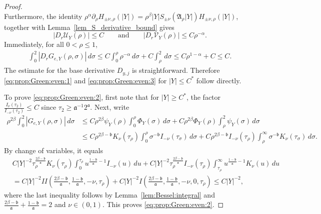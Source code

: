 \documentclass[12pt]{amsart}
\begin{document}
\begin{proof}
\begin{equation*}
\end{equation*}
Furthermore, the identity $\rho^{\alpha} \partial_\rho H_{\pm \nu, \rho}(|Y|) = \rho^{\beta} |Y| S_{\pm \nu}(\mathfrak A_\rho |Y|) H_{\pm \nu, \rho}(|Y|)$, together with
Lemma~\ref{lem_S_derivative_bound} gives
\begin{equation*}
    |D_r \mathcal{U}_Y(\rho)|\le C
    \qquad\text{and}\qquad
    |D_r \mathcal{V}_Y(\rho)|\le C \rho^{-\alpha}.
\end{equation*}
Immediately, for all $0<\rho\le 1$,
\begin{align*}
    \int_0^2 |D_r G_{e,Y}(\rho,\sigma)| \, d\sigma \le C \int_0^\rho \rho^{-\alpha}\, d\sigma + C\int_\rho^2 \, d\sigma \le C \rho^{1-\alpha} + C\le C.
\end{align*}
The estimate for the base derivative $D_{y,j}$ is straightforward. Therefore \eqref{eq:prop:Green:even:1} and \eqref{eq:prop:Green:even:3} for $|Y|\le C^*$ follow directly.

To prove \eqref{eq:prop:Green:even:2}, first note that for $|Y|\ge C^*$, the factor $\frac{I_\nu(\tau_2)}{I_{-\nu}(\tau_2)}\le C$ since $\tau_2 \ge \mathfrak a^{-1} 2^{\mathfrak a}$. Next, write
\begin{align*}
    \rho^{2\beta}\int_0^2 |G_{e,Y}(\rho,\sigma)| \, d\sigma &\le C \rho^{2\beta} \psi_Y(\rho) \int_0^\rho \Phi_Y(\sigma) \,d\sigma + C \rho^{2\beta} \Phi_Y(\rho) \int_\rho^2 \psi_Y(\sigma)\, d\sigma\\
    &\le C \rho^{2\beta - \mathfrak b} K_\nu(\tau_\rho) \int_0^\rho \sigma^{-\mathfrak b} I_{-\nu}(\tau_\sigma) \, d\sigma + C \rho^{2\beta - \mathfrak b} I_{-\nu}(\tau_\rho) \int_\rho^\infty \sigma^{-\mathfrak b} K_{\nu}(\tau_\sigma) \, d\sigma.
\end{align*}
By change of variables, it equals
\begin{align*}
    &C |Y|^{-2} \tau_\rho^{\frac{2\beta-\mathfrak b}{\mathfrak a}} K_\nu(\tau_\rho) \int_0^{\tau_\rho} u^{\frac{1-\mathfrak b}{\mathfrak a}-1}  I_{-\nu}(u) \, du + C |Y|^{-2} \tau_\rho^{\frac{2\beta-\mathfrak b}{\mathfrak a}} I_{-\nu}(\tau_\rho) \int_{\tau_\rho}^\infty u^{\frac{1-\mathfrak b}{\mathfrak a}-1}  K_{\nu}(u) \,  du \\
    &= C |Y|^{-2} II\left(\frac{2\beta-\mathfrak b}{\mathfrak a}, \frac{1-\mathfrak b}{\mathfrak a}, -\nu, \tau_\rho \right) + C |Y|^{-2} I\left(\frac{2\beta-\mathfrak b}{\mathfrak a}, \frac{1-\mathfrak b}{\mathfrak a}, -\nu, 0, \tau_\rho \right)\le C|Y|^{-2},
\end{align*}
where the last inequality follows by Lemma~\ref{lem:Bessel:integral} and $\frac{2\beta-\mathfrak b}{\mathfrak a}+ \frac{1-\mathfrak b}{\mathfrak a}=2$ and $\nu\in (0,1)$. This proves \eqref{eq:prop:Green:even:2}.


\end{proof}
\end{document}
